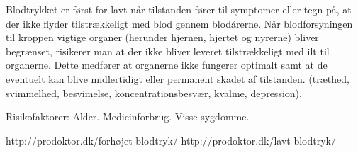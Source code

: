 Blodtrykket er først for lavt når tilstanden fører til symptomer eller tegn på, at der ikke flyder tilstrækkeligt med blod gennem blodårerne. Når blodforsyningen til kroppen vigtige organer (herunder hjernen, hjertet og nyrerne) bliver begrænset, risikerer man at der ikke bliver leveret tilstrækkeligt med ilt til organerne. Dette medfører at organerne ikke fungerer optimalt samt at de eventuelt kan blive midlertidigt eller permanent skadet af tilstanden. (træthed, svimmelhed, besvimelse, koncentrationsbesvær, kvalme, depression).  

Risikofaktorer: 
Alder. Medicinforbrug. Visse sygdomme.

http://prodoktor.dk/forhøjet-blodtryk/
http://prodoktor.dk/lavt-blodtryk/ 


